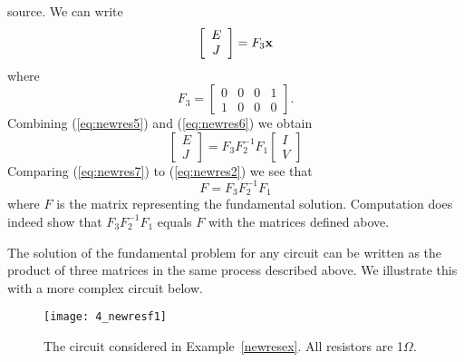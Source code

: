 source. We can write 
\begin{equation}
\label{eq:newres6}
\left[ \begin{array}{c} E \\ J \end{array} \right] = F_3 {\bf x} 
\end{equation}
where 
\[
F_3 = \left[ \begin{array}{cccc} 
0 & 0 & 0 & 1 \\
1 & 0 & 0 & 0 
\end{array} \right].
\]
Combining (\ref{eq:newres5}) and (\ref{eq:newres6}) we obtain 
\begin{equation}
\label{eq:newres7}
\left[ \begin{array}{c} E \\ J \end{array} \right] = F_3 F_2^{-1} F_1 
\left[ \begin{array}{c} I \\ V \end{array} \right]
\end{equation}
Comparing (\ref{eq:newres7}) to (\ref{eq:newres2}) we see that 
\[
F = F_3 F_2^{-1} F_1 
\]
where $F$ is the matrix representing the fundamental solution. Computation 
does indeed show that $F_3 F_2^{-1} F_1$ equals $F$ with 
the matrices defined above. 

The solution of the fundamental problem for any circuit can be written as the product of three 
matrices in the same process described above. We illustrate this with 
a more complex circuit below.

\begin{figure}
\centerline{\texttt{[image: 4\_newresf1]}}
\caption{The circuit considered in Example~\ref{newresex}. All resistors 
are 1$\Omega$. \label{newresf2}}
\end{figure}

